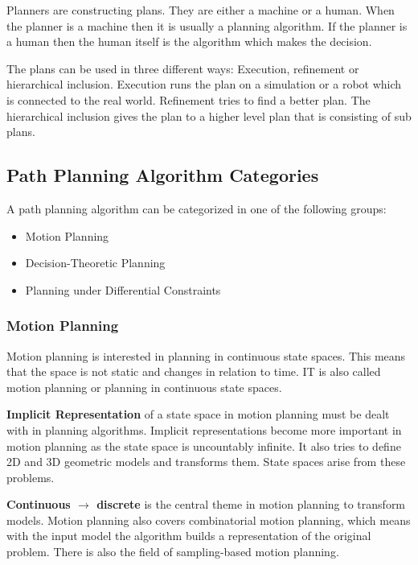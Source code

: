Planners are constructing plans. They are either a machine or a human. When the planner is a machine then it is usually a planning algorithm. If the planner is a human then the human itself is the algorithm which makes the decision.

The plans can be used in three different ways: Execution, refinement or hierarchical inclusion. Execution runs the plan on a simulation or a robot which is connected to the real world. Refinement tries to find a better plan. The hierarchical inclusion gives the plan to a higher level plan that is consisting of sub plans.

\cite{planning_algorithms_steven_m_lavalle}

\subsection{Path Planning Algorithm Categories}
A path planning algorithm can be categorized in one of the following groups:
\begin{itemize}
    \item Motion Planning
    \item Decision-Theoretic Planning
    \item Planning under Differential Constraints
\end{itemize}

\subsubsection{Motion Planning}

Motion planning is interested in planning in continuous state spaces. This means that the space is not static and changes in relation to time. IT is also called motion planning or planning in continuous state spaces.

\textbf{Implicit Representation} of a state space in motion planning must be dealt with in planning algorithms. Implicit representations become more important in motion planning as the state space is uncountably infinite. It also tries to define 2D and 3D geometric models and transforms them. State spaces arise from these problems.

\textbf{Continuous $\rightarrow$ discrete} is the central theme in motion planning to transform models. Motion planning also covers combinatorial motion planning, which means with the input model the algorithm builds a representation of the original problem. There is also the field of sampling-based motion planning.

